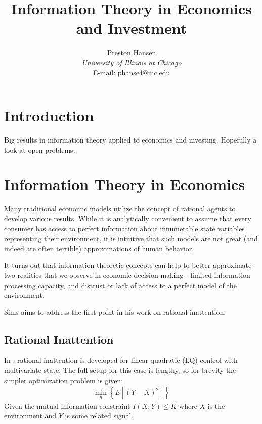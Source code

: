 \documentclass[10pt, twocolumn]{IEEEtran}
\begin{document}
\title{Information Theory in Economics and Investment}
\author{Preston Hansen\\
{\it University of Illinois at Chicago} \\
E-mail: phanse4@uic.edu}
\maketitle

\begin{abstract}
\end{abstract}

\section{Introduction}

Big results in information theory applied to economics and investing. Hopefully a look at open problems.

\section{Information Theory in Economics}
Many traditional economic models utilize the concept of rational agents to develop various results.
While it is analytically convenient to assume that every consumer has access to perfect information
about innumerable state variables representing their environment, it is intuitive that such models
are not great (and indeed are often terrible) approximations of human behavior.

It turns out that information theoretic concepts can help to better approximate two realities that
we observe in economic decision making - limited information processing capacity, and distrust or
lack of access to a perfect model of the environment.

Sims \cite{Sims2003} \cite{Sims2010} aims to address the first point in his work on rational inattention.
\subsection{Rational Inattention}
In \cite{Sims2003}, rational inattention is developed for linear quadratic (LQ) control with multivariate
state. The full setup for this case is lengthy, so for brevity the simpler optimization problem is given:
\begin{gather*}
  \min_{q}\left\{E\left[(Y-X)^{2}\right]\right\}
\end{gather*}
Given the mutual information constraint $I(X;Y) \le K$ where $X$
is the environment and $Y$ is some related signal.
\end{document}
